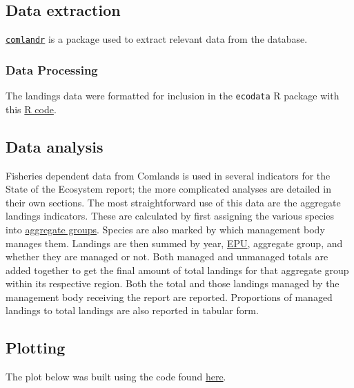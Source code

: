 \documentclass[
]{book}
\begin{document}
\hypertarget{data-extraction-9}{%
\subsection{Data extraction}\label{data-extraction-9}}

\href{https://github.com/NOAA-EDAB/comlandr}{\texttt{comlandr}} is a package used to extract relevant data from the database.

\hypertarget{data-processing-8}{%
\subsubsection{Data Processing}\label{data-processing-8}}

The landings data were formatted for inclusion in the \texttt{ecodata} R package with this \href{https://github.com/NOAA-EDAB/ecodata/blob/master/data-raw/get_comdat.R}{R code}.

\hypertarget{data-analysis-9}{%
\subsection{Data analysis}\label{data-analysis-9}}

Fisheries dependent data from Comlands is used in several indicators for the State of the Ecosystem report; the more complicated analyses are detailed in their own sections. The most straightforward use of this data are the aggregate landings indicators. These are calculated by first assigning the various species into \protect\hyperlink{aggroups}{aggregate groups}. Species are also marked by which management body manages them. Landings are then summed by year, \protect\hyperlink{epu}{EPU}, aggregate group, and whether they are managed or not. Both managed and unmanaged totals are added together to get the final amount of total landings for that aggregate group within its respective region. Both the total and those landings managed by the management body receiving the report are reported. Proportions of managed landings to total landings are also reported in tabular form.

\hypertarget{plotting-7}{%
\subsection{Plotting}\label{plotting-7}}

The plot below was built using the code found
\href{https://github.com/NOAA-EDAB/ecodata/blob/master/chunk-scripts/human_dimensions.Rmd-comm_landings.R}{here}.
\end{document}
